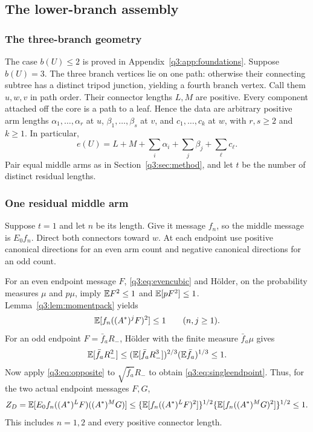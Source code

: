 \subsection{The lower-branch assembly}\label{q3:sec:assembly}
\subsubsection{The three-branch geometry}
The case $b(U)\le2$ is proved in Appendix~\ref{q3:app:foundations}. Suppose $b(U)=3$. The three branch vertices lie on one path: otherwise their connecting subtree has a distinct tripod junction, yielding a fourth branch vertex. Call them $u,w,v$ in path order. Their connector lengths $L,M$ are positive. Every component attached off the core is a path to a leaf. Hence the data are arbitrary positive arm lengths $\alpha_1,\ldots,\alpha_r$ at $u$, $\beta_1,\ldots,\beta_s$ at $v$, and $c_1,\ldots,c_k$ at $w$, with $r,s\ge2$ and $k\ge1$. In particular,
\begin{equation}\label{q3:eq:edgecount}
 e(U)=L+M+\sum_i\alpha_i+\sum_j\beta_j+\sum_\ell c_\ell.
\end{equation}
Pair equal middle arms as in Section~\ref{q3:sec:method}, and let $t$ be the number of distinct residual lengths.

\subsubsection{One residual middle arm}
Suppose $t=1$ and let $n$ be its length. Give it message $f_n$, so the middle message is $E_0f_n$. Direct both connectors toward $w$. At each endpoint use positive canonical directions for an even arm count and negative canonical directions for an odd count.

For an even endpoint message $F$, \eqref{q3:eq:evencubic} and H\"older, on the probability measures $\mu$ and $p\mu$, imply $\mathbb E F^2\le1$ and $\mathbb E[pF^2]\le1$. Lemma~\ref{q3:lem:momentpack} yields
\begin{equation}\label{q3:eq:singleendpoint}
 \mathbb E[f_n((A^*)^jF)^2]\le1\qquad(n,j\ge1).
\end{equation}
For an odd endpoint $F=\bar f_aR_-$, H\"older with the finite measure $\bar f_a\mu$ gives
\[
 \mathbb E[\bar f_aR_-^2]\le
 (\mathbb E[\bar f_aR_-^3])^{2/3}(\mathbb E\bar f_a)^{1/3}\le1.
\]
Now apply \eqref{q3:eq:opposite} to $\sqrt{\bar f_a}R_-$ to obtain \eqref{q3:eq:singleendpoint}. Thus, for the two actual endpoint messages $F,G$,
\[
 Z_D=\mathbb E[E_0f_n((A^*)^LF)((A^*)^MG)]
 \le\{\mathbb E[f_n((A^*)^LF)^2]\}^{1/2}
      \{\mathbb E[f_n((A^*)^MG)^2]\}^{1/2}\le1.
\]
This includes $n=1,2$ and every positive connector length.

